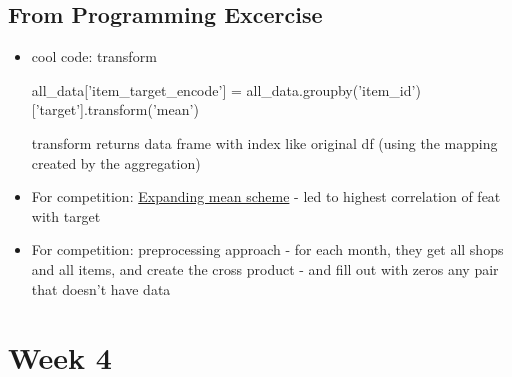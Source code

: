 \documentclass[a4paper]{report}
\newcommand{\brown}{\color{brown}}
\newenvironment{tightcenter}{
  \setlength\topsep{0pt}
  \setlength\parskip{0pt}
  \begin{center}
  }{
  \end{center}
}
\newenvironment{codesnip}[1]
{\begin{tightcenter}\begin{minipage}{.85\textwidth}#1}
{\end{minipage}\end{tightcenter}}
\begin{document}
\section{From Programming Excercise}
\begin{itemize}
    \item cool code: transform
      \begin{codesnip}{\brown}
	all\_data['item\_target\_encode'] = all\_data.groupby('item\_id')['target'].transform('mean')
      \end{codesnip}
      transform returns data frame with index like original df (using the mapping created by the aggregation)
    \item For competition: \underline{Expanding mean scheme} - led to highest correlation of feat with target
    \item For competition: preprocessing approach - for each month, they get all shops and all items, and create the cross product - and fill out with zeros any pair that doesn't have data
  \end{itemize}	


\chapter{Week 4}
\end{document}
